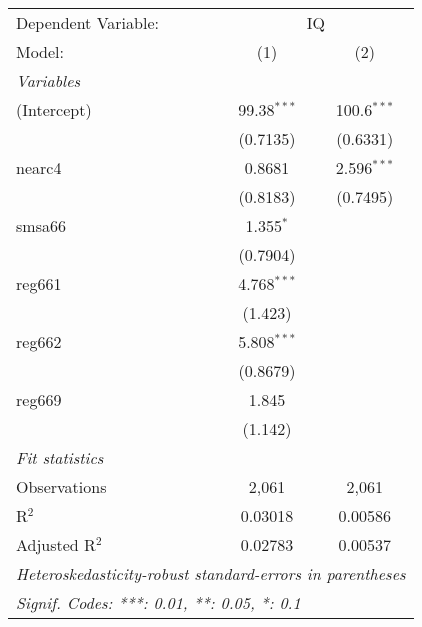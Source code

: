 \documentclass[
]{article}
\begin{document}
\begin{center}\begingroup\centering\begin{tabular}{lcc}   \tabularnewline \midrule \midrule   Dependent Variable: & \multicolumn{2}{c}{IQ}\\   Model:         & (1)           & (2)\\     \midrule   \emph{Variables}\\   (Intercept)    & 99.38$^{***}$ & 100.6$^{***}$\\                     & (0.7135)      & (0.6331)\\      nearc4         & 0.8681        & 2.596$^{***}$\\                     & (0.8183)      & (0.7495)\\      smsa66         & 1.355$^{*}$   &   \\                     & (0.7904)      &   \\      reg661         & 4.768$^{***}$ &   \\                     & (1.423)       &   \\      reg662         & 5.808$^{***}$ &   \\                     & (0.8679)      &   \\      reg669         & 1.845         &   \\                     & (1.142)       &   \\      \midrule   \emph{Fit statistics}\\   Observations   & 2,061         & 2,061\\     R$^2$          & 0.03018       & 0.00586\\     Adjusted R$^2$ & 0.02783       & 0.00537\\     \midrule \midrule   \multicolumn{3}{l}{\emph{Heteroskedasticity-robust standard-errors in parentheses}}\\   \multicolumn{3}{l}{\emph{Signif. Codes: ***: 0.01, **: 0.05, *: 0.1}}\\\end{tabular}\par\endgroup\end{center}
\end{document}
